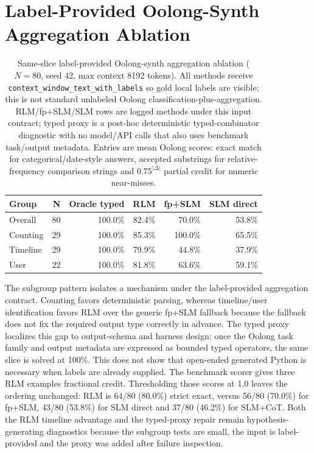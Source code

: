 \documentclass[letterpaper]{article}
\begin{document}
\section{Label-Provided Oolong-Synth Aggregation Ablation}

\begin{table}[!t]
\centering
\small
\setlength{\tabcolsep}{3pt}
\begin{tabular}{@{}p{6.0cm}rrrrr@{}}
\toprule
\textbf{Group} & \textbf{N} & \textbf{Oracle typed} & \textbf{RLM} & \textbf{fp+SLM} & \textbf{SLM direct} \\
\midrule
Overall & 80 & 100.0\% & 82.4\% & 70.0\% & 53.8\% \\
Counting & 29 & 100.0\% & 85.3\% & 100.0\% & 65.5\% \\
Timeline & 29 & 100.0\% & 79.9\% & 44.8\% & 37.9\% \\
User & 22 & 100.0\% & 81.8\% & 63.6\% & 59.1\% \\
\bottomrule
\end{tabular}
\caption{Same-slice label-provided Oolong-synth aggregation ablation ($N=80$, seed 42, max context 8192 tokens). All methods receive \texttt{context\_window\_text\_with\_labels} so gold local labels are visible; this is not standard unlabeled Oolong classification-plus-aggregation. RLM/fp+SLM/SLM rows are logged methods under this input contract; typed proxy is a post-hoc deterministic typed-combinator diagnostic with no model/API calls that also uses benchmark task/output metadata. Entries are mean Oolong scores: exact match for categorical/date-style answers, accepted substrings for relative-frequency comparison strings and $0.75^{|\Delta|}$ partial credit for numeric near-misses.}
\label{tab:supp-oolong}
\end{table}

The subgroup pattern isolates a mechanism under the label-provided aggregation contract. Counting favors deterministic parsing, whereas timeline/user identification favors RLM over the generic fp+SLM fallback because the fallback does not fix the required output type correctly in advance. The typed proxy localizes this gap to output-schema and harness design: once the Oolong task family and output metadata are expressed as bounded typed operators, the same slice is solved at 100\%. This does not show that open-ended generated Python is necessary when labels are already supplied. The benchmark scorer gives three RLM examples fractional credit. Thresholding those scores at 1.0 leaves the ordering unchanged: RLM is 64/80 (80.0\%) strict exact, versus 56/80 (70.0\%) for fp+SLM, 43/80 (53.8\%) for SLM direct and 37/80 (46.2\%) for SLM+CoT. Both the RLM timeline advantage and the typed-proxy repair remain hypothesis-generating diagnostics because the subgroup tests are small, the input is label-provided and the proxy was added after failure inspection.
\end{document}

